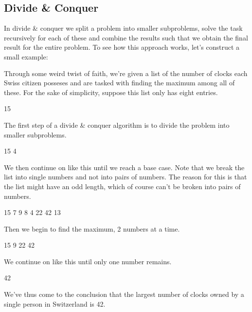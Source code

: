 \documentclass[main.tex]{subfiles}
\begin{document}
\subsection{Divide \& Conquer} \label{Divide \& Conquer}
In divide \& conquer we split a problem into smaller subproblems, solve the task recursively for each of these and combine the results such that we obtain the final result for the entire problem. To see how this approach works, let's construct a small example:
\begin{example}
    Through some weird twist of faith, we're given a list of the number of clocks each Swiss citizen posseses and are tasked with finding the maximum among all of these. For the sake of simplicity, suppose this list only has eight entries. 
    \begin{center}
        15
    \end{center}
    The first step of a divide \& conquer algorithm is to divide the problem into smaller subproblems.
    \begin{center}
        \hspace*{\fill} 15 \hspace*{\fill} 4 \hspace*{\fill}
    \end{center}
    We then continue on like this until we reach a base case. Note that we break the list into single numbers and not into pairs of numbers. The reason for this is that the list might have an odd length, which of course can't be broken into pairs of numbers.
    \begin{center}
        \hspace*{\fill} 15 \hspace*{\fill} 7 \hspace*{\fill} 9 \hspace*{\fill} 8 \hspace*{\fill} 4 \hspace*{\fill} 22 \hspace*{\fill} 42 \hspace*{\fill} 13 \hspace*{\fill}
    \end{center}
    Then we begin to find the maximum, 2 numbers at a time.
    \begin{center}
        \hspace*{\fill} 15 \hspace*{\fill}  9 \hspace*{\fill} 22 \hspace*{\fill} 42 \hspace*{\fill}
    \end{center}
    We continue on like this until only one number remains.
    \begin{center}
        42
    \end{center}
    We've thus come to the conclusion that the largest number of clocks owned by a single person in Switzerland is 42.
\end{example}
\end{document}
